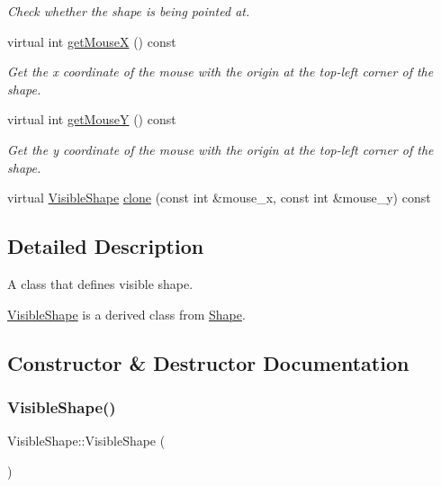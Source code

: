 \begin{DoxyCompactItemize}
\begin{DoxyCompactList}\small\item\em Check whether the shape is being pointed at. \end{DoxyCompactList}\item 
virtual int \mbox{\hyperlink{class_visible_shape_a53dd71f6cee05f9707d899c4e1434070}{get\+MouseX}} () const
\begin{DoxyCompactList}\small\item\em Get the x coordinate of the mouse with the origin at the top-\/left corner of the shape. \end{DoxyCompactList}\item 
virtual int \mbox{\hyperlink{class_visible_shape_a6b0536f0437e514ba1bda6927becb603}{get\+MouseY}} () const
\begin{DoxyCompactList}\small\item\em Get the y coordinate of the mouse with the origin at the top-\/left corner of the shape. \end{DoxyCompactList}\item 
virtual \mbox{\hyperlink{class_visible_shape}{Visible\+Shape}} \mbox{\hyperlink{class_visible_shape_a312fc3d9e5d7f648082d6f633f980fda}{clone}} (const int \&mouse\+\_\+x, const int \&mouse\+\_\+y) const
\end{DoxyCompactItemize}


\subsection{Detailed Description}
A class that defines visible shape. 

\mbox{\hyperlink{class_visible_shape}{Visible\+Shape}} is a derived class from \mbox{\hyperlink{class_shape}{Shape}}. 

\subsection{Constructor \& Destructor Documentation}
\mbox{\label{class_visible_shape_a280deeca2a39d227887ff2e13b009c0a}} 
\subsubsection{\texorpdfstring{Visible\+Shape()}{VisibleShape()}\hspace{0.1cm}{\footnotesize\ttfamily [1/3]}}
{\footnotesize\ttfamily Visible\+Shape\+::\+Visible\+Shape (\begin{DoxyParamCaption}{ }\end{DoxyParamCaption})}


